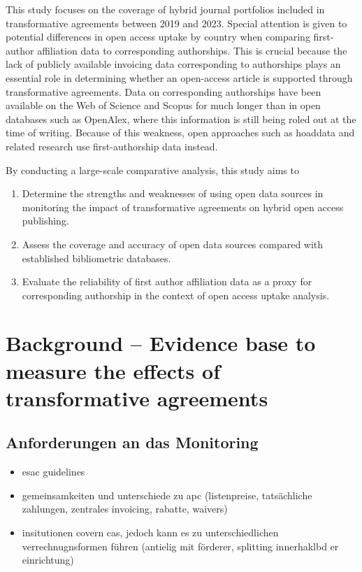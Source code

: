 \documentclass[a4paper,man,floatsintext,longtable,noextraspace,12pt]{apa6}
\providecommand{\tightlist}{%
  \setlength{\itemsep}{0pt}\setlength{\parskip}{0pt}}
\begin{document}
This study focuses on the coverage of hybrid journal portfolios included
in transformative agreements between 2019 and 2023. Special attention is
given to potential differences in open access uptake by country when
comparing first-author affiliation data to corresponding authorships.
This is crucial because the lack of publicly available invoicing data
corresponding to authorships plays an essential role in determining
whether an open-access article is supported through transformative
agreements. Data on corresponding authorships have been available on the
Web of Science and Scopus for much longer than in open databases such as
OpenAlex, where this information is still being roled out at the time of
writing. Because of this weakness, open approaches such as hoaddata and
related research use first-authorship data instead.

By conducting a large-scale comparative analysis, this study aims to

\begin{enumerate}
\def\labelenumi{\arabic{enumi}.}
\tightlist
\item
  Determine the strengths and weaknesses of using open data sources in
  monitoring the impact of transformative agreements on hybrid open
  access publishing.
\item
  Assess the coverage and accuracy of open data sources compared with
  established bibliometric databases.
\item
  Evaluate the reliability of first author affiliation data as a proxy
  for corresponding authorship in the context of open access uptake
  analysis.
\end{enumerate}

\section{Background -- Evidence base to measure the effects of
transformative
agreements}\label{background-evidence-base-to-measure-the-effects-of-transformative-agreements}

\subsection{Anforderungen an das
Monitoring}\label{anforderungen-an-das-monitoring}

\begin{itemize}
\tightlist
\item
  esac guidelines
\item
  gemeinsamkeiten und unterschiede zu apc (listenpreise, tatsächliche
  zahlungen, zentrales invoicing, rabatte, waivers)
\item
  insitutionen covern cas, jedoch kann es zu unterschiedlichen
  verrechnugnsformen führen (antielig mit förderer, splitting
  innerhaklbd er einrichtung)
\end{itemize}
\end{document}
